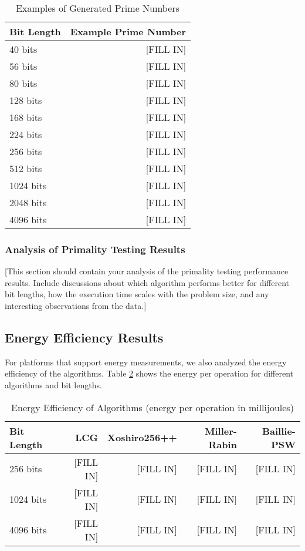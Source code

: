 \begin{table}[H]
\centering
\caption{Examples of Generated Prime Numbers}
\label{tab:generated_primes}
\begin{tabular}{@{}lr@{}}
\toprule
\textbf{Bit Length} & \textbf{Example Prime Number} \\
\midrule
40 bits     & [FILL IN] \\
56 bits     & [FILL IN] \\
80 bits     & [FILL IN] \\
128 bits    & [FILL IN] \\
168 bits    & [FILL IN] \\
224 bits    & [FILL IN] \\
256 bits    & [FILL IN] \\
512 bits    & [FILL IN] \\
1024 bits   & [FILL IN] \\
2048 bits   & [FILL IN] \\
4096 bits   & [FILL IN] \\
\bottomrule
\end{tabular}
\end{table}

\subsubsection{Analysis of Primality Testing Results}

[This section should contain your analysis of the primality testing performance results. Include discussions about which algorithm performs better for different bit lengths, how the execution time scales with the problem size, and any interesting observations from the data.]

\subsection{Energy Efficiency Results}

For platforms that support energy measurements, we also analyzed the energy efficiency of the algorithms. Table \ref{tab:energy_efficiency} shows the energy per operation for different algorithms and bit lengths.

\begin{table}[H]
\centering
\caption{Energy Efficiency of Algorithms (energy per operation in millijoules)}
\label{tab:energy_efficiency}
\begin{tabular}{@{}lrrrr@{}}
\toprule
\textbf{Bit Length} & \textbf{LCG} & \textbf{Xoshiro256++} & \textbf{Miller-Rabin} & \textbf{Baillie-PSW} \\
\midrule
256 bits    & [FILL IN] & [FILL IN] & [FILL IN] & [FILL IN] \\
1024 bits   & [FILL IN] & [FILL IN] & [FILL IN] & [FILL IN] \\
4096 bits   & [FILL IN] & [FILL IN] & [FILL IN] & [FILL IN] \\
\bottomrule
\end{tabular}
\end{table}

